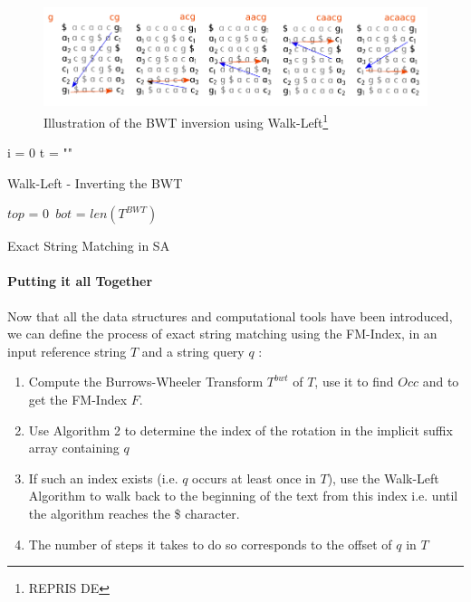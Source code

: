 \begin{figure}[H]
    \centering
    \includegraphics[scale=0.5]{Figures/WL.png}
    \caption{Illustration of the BWT inversion using Walk-Left\footnote{REPRIS DE}}
    \label{fig:walkleft}
\end{figure}

\begin{minipage}[t]{0.45\textwidth}
\begin{algorithm}[H]
	\SetAlgoLined
	i = 0\;
	t = ""\;
\caption{Walk-Left - Inverting the BWT}
\label{alg:WL}
\end{algorithm}
\end{minipage}
\begin{minipage}[t]{0.45\textwidth}
\begin{algorithm}[H]
\SetAlgoLined
{}
	$top$ = 0\
	$bot$ = $len(T^{BWT})$\;
\caption{Exact String Matching in SA}
\label{alg:match}
\end{algorithm}
\end{minipage}

\vspace*{5mm}


\paragraph{Putting it all Together}

Now that all the data structures and computational tools have been introduced, we can define the process of exact string matching using the FM-Index, in an input reference string $T$ and a string query $q$ :
\begin{enumerate}
\item Compute the Burrows-Wheeler Transform $T^{bwt}$ of $T$, use it to find $Occ$ and to get the FM-Index $F$.
\item Use Algorithm 2 to determine the index of the rotation in the implicit suffix array containing $q$
\item If such an index exists (i.e. $q$ occurs at least once in $T$), use the Walk-Left Algorithm to walk back to the beginning of the text from this index i.e. until the algorithm reaches the \$ character.
\item The number of steps it takes to do so corresponds to the offset of $q$ in $T$
\end{enumerate}

